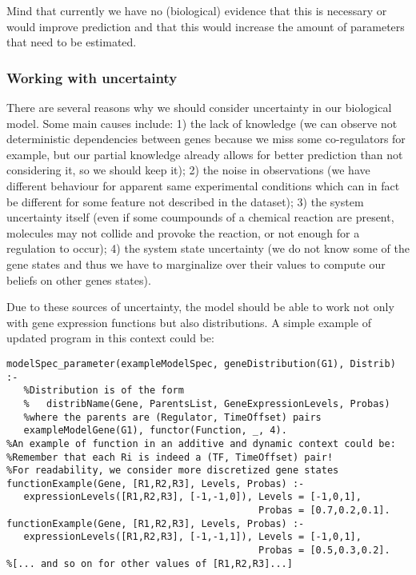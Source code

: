 \documentclass{article}
\begin{document}
Mind that currently we have no (biological) evidence that this is necessary or would improve prediction and that this would increase the amount of parameters that need to be estimated.
\subsubsection{Working with uncertainty}

There are several reasons why we should consider uncertainty in our biological model. Some main causes include: 1) the lack of knowledge (we can observe not deterministic dependencies between genes because we miss some co-regulators for example, but our partial knowledge already allows for better prediction than not considering it, so we should keep it); 2) the noise in observations (we have different behaviour for apparent same experimental conditions which can in fact be different for some feature not described in the dataset); 3) the system uncertainty itself (even if some coumpounds of a chemical reaction are present, molecules may not collide and provoke the reaction, or not enough for a regulation to occur); 4) the system state uncertainty (we do not know some of the gene states and thus we have to marginalize over their values to compute our beliefs on other genes states). 

Due to these sources of uncertainty, the model should be able to work not only with gene expression functions but also distributions. A simple example of updated program in this context could be:
\begin{verbatim}
modelSpec_parameter(exampleModelSpec, geneDistribution(G1), Distrib) :-
   %Distribution is of the form 
   %   distribName(Gene, ParentsList, GeneExpressionLevels, Probas) 
   %where the parents are (Regulator, TimeOffset) pairs
   exampleModelGene(G1), functor(Function, _, 4).
%An example of function in an additive and dynamic context could be:
%Remember that each Ri is indeed a (TF, TimeOffset) pair!
%For readability, we consider more discretized gene states
functionExample(Gene, [R1,R2,R3], Levels, Probas) :- 
   expressionLevels([R1,R2,R3], [-1,-1,0]), Levels = [-1,0,1], 
                                            Probas = [0.7,0.2,0.1].
functionExample(Gene, [R1,R2,R3], Levels, Probas) :- 
   expressionLevels([R1,R2,R3], [-1,-1,1]), Levels = [-1,0,1], 
                                            Probas = [0.5,0.3,0.2].
%[... and so on for other values of [R1,R2,R3]...]
\end{verbatim}
\end{document}
